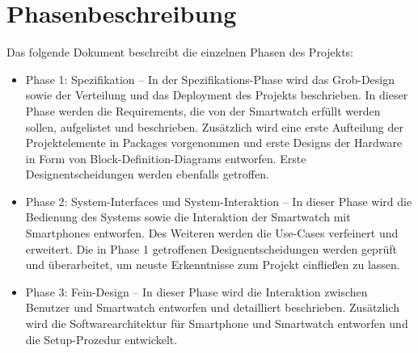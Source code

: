 \section{Phasenbeschreibung}
Das folgende Dokument beschreibt die einzelnen Phasen des Projekts:
\begin{itemize}
  \item Phase 1: Spezifikation -- In der Spezifikations-Phase wird das Grob-Design sowie der Verteilung und das Deployment des Projekts beschrieben. In dieser Phase werden die Requirements, die von der Smartwatch erfüllt werden sollen, aufgelistet und beschrieben. Zusätzlich wird eine erste Aufteilung der Projektelemente in Packages vorgenommen und erste Designs der Hardware in Form von Block-Definition-Diagrams entworfen. Erste Designentscheidungen werden ebenfalls getroffen.

  \item Phase 2: System-Interfaces und System-Interaktion -- In dieser Phase wird die Bedienung des Systems sowie die Interaktion der Smartwatch mit Smartphones entworfen. Des Weiteren werden die Use-Cases verfeinert und erweitert. Die in Phase 1 getroffenen Designentscheidungen werden geprüft und überarbeitet, um neuste Erkenntnisse zum Projekt einfließen zu lassen.

  \item Phase 3: Fein-Design -- In dieser Phase wird die Interaktion zwischen Benutzer und Smartwatch entworfen und detailliert beschrieben. Zusätzlich wird die Softwarearchitektur für Smartphone und Smartwatch entworfen und die Setup-Prozedur entwickelt.
\end{itemize}
